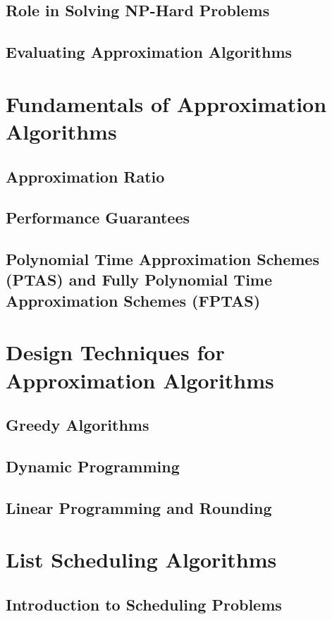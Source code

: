\documentclass[12pt]{book} %
\begin{document}
\subsection{Role in Solving NP-Hard Problems}
\subsection{Evaluating Approximation Algorithms}

\section{Fundamentals of Approximation Algorithms}
\subsection{Approximation Ratio}
\subsection{Performance Guarantees}
\subsection{Polynomial Time Approximation Schemes (PTAS) and Fully Polynomial Time Approximation Schemes (FPTAS)}

\section{Design Techniques for Approximation Algorithms}
\subsection{Greedy Algorithms}
\subsection{Dynamic Programming}
\subsection{Linear Programming and Rounding}

\section{List Scheduling Algorithms}
\subsection{Introduction to Scheduling Problems}
\end{document}
